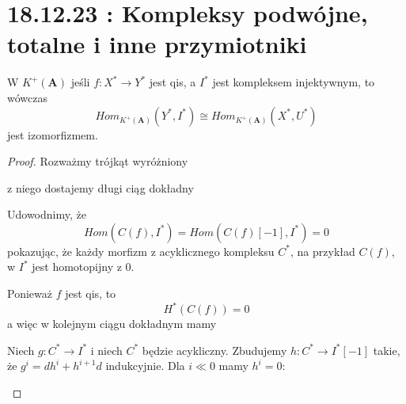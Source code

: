 \section{18.12.23 : Kompleksy podwójne, totalne i inne przymiotniki}

\begin{lemma}
  W $K^+(\mathbf{A})$ jeśli $f:X^*\to Y^*$ jest qis, a $I^*$ jest kompleksem injektywnym, to wówczas
  $$Hom_{K^+(\mathbf{A})}(Y^*, I^*)\cong Hom_{K^+(\mathbf{A})}(X^*, U^*)$$
  jest izomorfizmem.
\end{lemma}

\begin{proof}
  Rozważmy trójkąt wyróżniony
  \begin{center}\end{center}
  z niego dostajemy długi ciąg dokładny
  \begin{center}\end{center}
  Udowodnimy, że 
  $$Hom(C(f), I^*)=Hom(C(f)[-1],I^*)=0$$ 
  pokazując, że każdy morfizm z acyklicznego kompleksu $C^*$, na przykład $C(f)$, w $I^*$ jest homotopijny z $0$.

  Ponieważ $f$ jest qis, to 
  $$H^*(C(f))=0$$
  a więc w kolejnym ciągu dokładnym mamy
  \begin{center}\end{center}

  Niech $g:C^*\to I^*$ i niech $C^*$ będzie acykliczny. Zbudujemy $h:C^*\to I^*[-1]$ takie, że $g^i=dh^i+h^{i+1}d$ indukcyjnie. Dla $i\ll 0$ mamy $h^i=0$:
  \begin{center}\end{center}


\end{proof}
